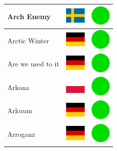 \documentclass[12pt, a4paper, twoside]{report}
\begin{document}
\begin{center}
\begin{longtable}{|p{5cm}|p{2cm}|p{2cm}|}
 Arch Enemy                                                 & \includegraphics[width=1cm]{../img/flags/se} &   \includegraphics[width=1cm]{../likes/y} \\ \hline
 Arctic Winter                                              & \includegraphics[width=1cm]{../img/flags/de} &   \includegraphics[width=1cm]{../likes/y} \\ \hline
 Are we used to it                                          & \includegraphics[width=1cm]{../img/flags/de} &   \includegraphics[width=1cm]{../likes/y} \\ \hline
 Arkona                                                     & \includegraphics[width=1cm]{../img/flags/pl} &   \includegraphics[width=1cm]{../likes/y} \\ \hline
 Arkuum                                                     & \includegraphics[width=1cm]{../img/flags/de} &   \includegraphics[width=1cm]{../likes/y} \\ \hline
 Arroganz                                                   & \includegraphics[width=1cm]{../img/flags/de} &   \includegraphics[width=1cm]{../likes/y} \\ \hline

\end{longtable}
\end{center}
\end{document}
